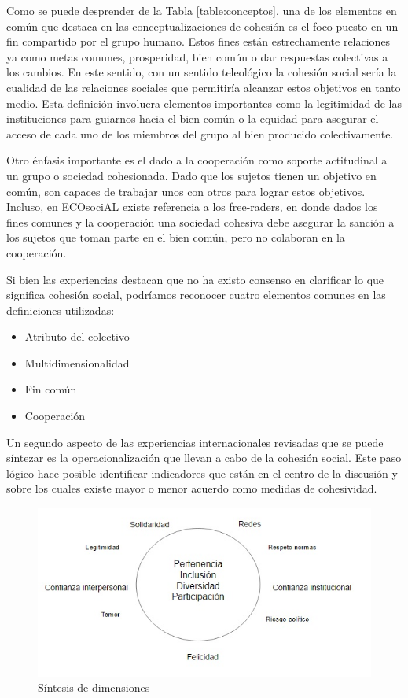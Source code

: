 \documentclass[
  12pt,
]{book}
\begin{document}
Como se puede desprender de la Tabla {[}table:conceptos{]}, una de los
elementos en común que destaca en las conceptualizaciones de cohesión es
el foco puesto en un fin compartido por el grupo humano. Estos fines
están estrechamente relaciones ya como metas comunes, prosperidad, bien
común o dar respuestas colectivas a los cambios. En este sentido, con un
sentido teleológico la cohesión social sería la cualidad de las
relaciones sociales que permitiría alcanzar estos objetivos en tanto
medio. Esta definición involucra elementos importantes como la
legitimidad de las instituciones para guiarnos hacia el bien común o la
equidad para asegurar el acceso de cada uno de los miembros del grupo al
bien producido colectivamente.

Otro énfasis importante es el dado a la cooperación como soporte
actitudinal a un grupo o sociedad cohesionada. Dado que los sujetos
tienen un objetivo en común, son capaces de trabajar unos con otros para
lograr estos objetivos. Incluso, en ECOsociAL existe referencia a los
free-raders, en donde dados los fines comunes y la cooperación una
sociedad cohesiva debe asegurar la sanción a los sujetos que toman parte
en el bien común, pero no colaboran en la cooperación.

Si bien las experiencias destacan que no ha existo consenso en
clarificar lo que significa cohesión social, podríamos reconocer cuatro
elementos comunes en las definiciones utilizadas:

\begin{itemize}
\item
  Atributo del colectivo
\item
  Multidimensionalidad
\item
  Fin común
\item
  Cooperación
\end{itemize}

Un segundo aspecto de las experiencias internacionales revisadas que se
puede síntezar es la operacionalización que llevan a cabo de la cohesión
social. Este paso lógico hace posible identificar indicadores que están
en el centro de la discusión y sobre los cuales existe mayor o menor
acuerdo como medidas de cohesividad.

\begin{figure}
\centering
\includegraphics{inputs/images/comun.jpg}
\caption{Síntesis de dimensiones}
\end{figure}
\end{document}
